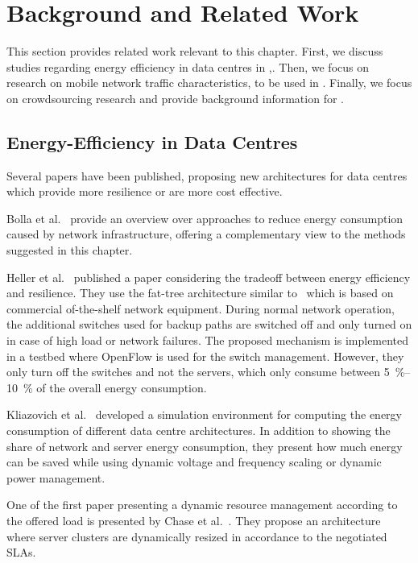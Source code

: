 \section{Background and Related Work}\label{sec:cloud:related_work}
This section provides related work relevant to this chapter.
First, we discuss studies regarding energy efficiency in data centres in ,.
Then, we focus on research on mobile network traffic characteristics, to be used in .
Finally, we focus on crowdsourcing research and provide background information for .

\subsection{Energy-Efficiency in Data Centres}
Several papers have been published, proposing new architectures for data centres which provide more resilience or are more cost effective\cite{Al-Fares2008, Greenberg2009a, Guo2009}.

Bolla et al.~\cite{Bolla2011} provide an overview over approaches to reduce energy consumption caused by network infrastructure, offering a complementary view to the methods suggested in this chapter.

Heller et al.~\cite{Heller2010} published a paper considering the tradeoff between energy efficiency and resilience.
They use the fat-tree architecture similar to~\cite{Al-Fares2008, Greenberg2009a} which is based on commercial of-the-shelf network equipment.
During normal network operation, the additional switches used for backup paths are switched off and only turned on in case of high load or network failures.
The proposed mechanism is implemented in a testbed where OpenFlow is used for the switch management.
However, they only turn off the switches and not the servers, which only consume between \SIrange{5}{10}{\percent} of the overall energy consumption.

Kliazovich et al.~\cite{Kliazovich2010} developed a simulation environment for computing the energy consumption of different data centre architectures. In addition to showing the share of network and server energy consumption, they present how much energy can be saved while using dynamic voltage and frequency scaling or dynamic power management.

One of the first paper presenting a dynamic resource management according to the offered load  is presented by Chase et al.~\cite{Chase2001}. They propose an architecture where server clusters are dynamically resized in accordance to the negotiated SLAs.

